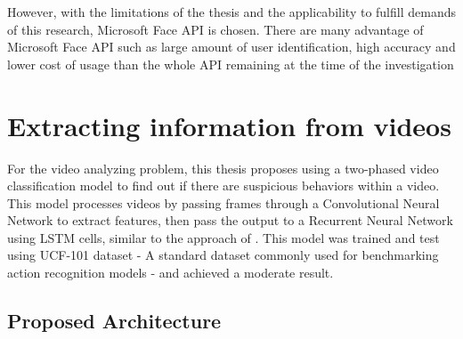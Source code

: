 However, with the limitations of the thesis and the applicability to fulfill demands of this research, Microsoft Face API is chosen. There are many advantage of Microsoft Face API such as large amount of user identification, high accuracy and lower cost of usage than the whole API remaining at the time of the investigation


\section{Extracting information from videos}
For the video analyzing problem, this thesis proposes using a two-phased video classification model to find out if there are suspicious behaviors within a video. This model processes videos by passing frames through a Convolutional Neural Network to extract features, then pass the output to a Recurrent Neural Network using LSTM cells, similar to the approach of \cite{DBLP:journals/corr/DonahueHGRVSD14}. This model was trained and test using UCF-101 dataset - A standard dataset commonly used for benchmarking action recognition models - and achieved a moderate result.
\subsection{Proposed Architecture}
